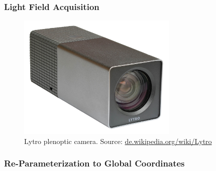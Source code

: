 \documentclass[12pt, compress]{beamer}
\begin{document}
\begin{frame}[fragile]
	\frametitle{Light Field Acquisition}
	
	\begin{figure}
		\captionsetup{font=scriptsize}
		\includegraphics[height = 6cm]{images/Lytro_Light_Field_Camera-front_background_removed.png}
		\caption*{Lytro plenoptic camera. Source: \href{https://de.wikipedia.org/wiki/Lytro}{de.wikipedia.org/wiki/Lytro}}
	\end{figure}
	
\end{frame}

\begin{frame}[fragile]
	\frametitle{Re-Parameterization to Global Coordinates}
	
	\begin{center}
	\end{center}
\end{frame}
\end{document}
